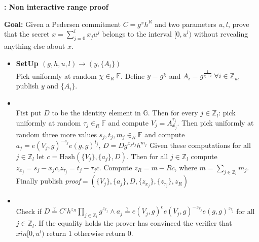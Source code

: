 \begin{algorithm}[]
\caption{\textbf{: Non interactive range proof}}
\textbf{Goal:} Given a Pedersen commitment $C=g^x h^R$ and two parameters $u,l$, prove that the secret $x=\sum_{j=0}^l x_j u^j$ belongs to the interval $[0,u^l)$ without revealing anything else about $x$.
\vspace{2pt}
\hline
\vspace{2pt}
\begin{itemize}
  \item\textbf{SetUp $(g,h,u,l)\xrightarrow[]{}(y,\{A_{i}\})$}\\
Pick uniformly at random $\chi\in_R\mathds{F}$. Define $y=g^\chi$ and $A_i=g^{\frac{1}{\chi+i}} \: \forall i\in\mathds{Z}_u$, publish $y$ and $\{A_i\}$.

\item{}\\
Fist put $D$ to be the identity element in $\mathds{G}$. Then for every $j\in\mathds{Z}_l$: pick uniformly at random $\tau_j\in_R\mathds{F}$ and compute $V_j=A_{x_j}^{\tau_j}$. Then pick uniformly at random three more values $s_j,t_j,m_j\in_R\mathds{F}$ and compute $a_j=e(V_j,g)^{-s_j}e(g,g)^{t_j}$, $D=Dg^{x_js_j}h^{m_j}$ Given these computations for all $j\in\mathds{Z}_l$ let $c=\text{Hash}(\{V_j\},\{a_j\},D)$. Then for all $j\in\mathds{Z}_l$ compute $z_{x_j}=s_j-x_jc$,$z_{\tau_j}=t_j-\tau_jc$. Compute $z_R=m-Rc$, where $m=\sum_{j\in\mathds{Z}_l}m_j$. Finally publish \textit{proof}$=(\{V_j\},\{a_j\},D,\{z_{x_j}\},\{z_{\tau_j}\},z_R)$ 

\item{}\\
Check if $D\overset{?}{=}C^ch^{z_R}\prod_{j\in\mathds{Z}_l}g^{z_{x_j}}\wedge a_j \overset{?}{=} e(V_j,g)^c e(V_j,g)^{-z_{x_j}}e(g,g)^{z_{\tau_j}}$ for all $j\in\mathds{Z}_l$.  If the equality holds the prover has convinced the verifier that $xin [0,u^l)$ return $1$ otherwise return $0$.
\end{itemize}
\label{alg:ZKRP}
\end{algorithm}


